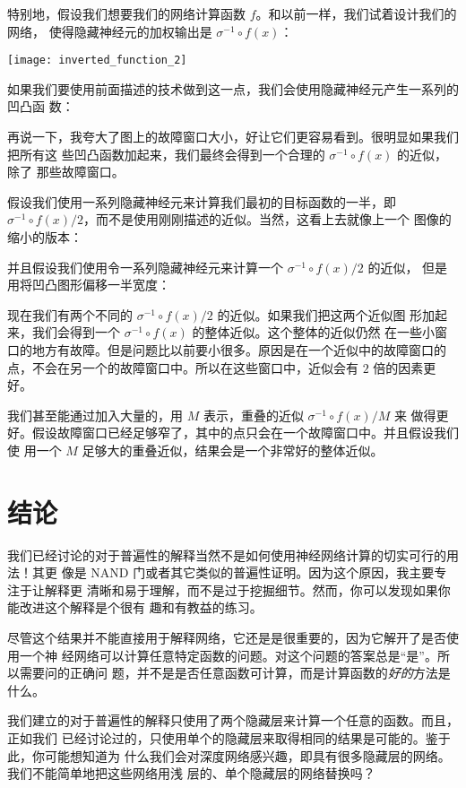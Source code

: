 特别地，假设我们想要我们的网络计算函数 $f$。和以前一样，我们试着设计我们的网络，
使得隐藏神经元的加权输出是 $\sigma^{-1} \circ f(x)$：
\begin{center}
  \texttt{[image: inverted\_function\_2]}
\end{center}

如果我们要使用前面描述的技术做到这一点，我们会使用隐藏神经元产生一系列的凹凸函
数：

再说一下，我夸大了图上的故障窗口大小，好让它们更容易看到。很明显如果我们把所有这
些凹凸函数加起来，我们最终会得到一个合理的 $\sigma^{-1} \circ f(x)$ 的近似，除了
那些故障窗口。

假设我们使用一系列隐藏神经元来计算我们最初的目标函数的一半，即
$\sigma^{-1} \circ f(x) / 2$，而不是使用刚刚描述的近似。当然，这看上去就像上一个
图像的缩小的版本：

并且假设我们使用令一系列隐藏神经元来计算一个 $\sigma^{-1} \circ f(x) / 2$ 的近似，
但是用将凹凸图形偏移一半宽度：

现在我们有两个不同的 $\sigma^{-1} \circ f(x) / 2$ 的近似。如果我们把这两个近似图
形加起来，我们会得到一个 $\sigma^{-1} \circ f(x)$ 的整体近似。这个整体的近似仍然
在一些小窗口的地方有故障。但是问题比以前要小很多。原因是在一个近似中的故障窗口的
点，不会在另一个的故障窗口中。所以在这些窗口中，近似会有 $2$ 倍的因素更好。

我们甚至能通过加入大量的，用 $M$ 表示，重叠的近似 $\sigma^{-1} \circ f(x) / M$ 来
做得更好。假设故障窗口已经足够窄了，其中的点只会在一个故障窗口中。并且假设我们使
用一个 $M$ 足够大的重叠近似，结果会是一个非常好的整体近似。

\section{结论}
\label{sec:conclusion}

我们已经讨论的对于普遍性的解释当然不是如何使用神经网络计算的切实可行的用法！其更
像是 {\serif NAND} 门或者其它类似的普遍性证明。因为这个原因，我主要专注于让解释更
清晰和易于理解，而不是过于挖掘细节。然而，你可以发现如果你能改进这个解释是个很有
趣和有教益的练习。

尽管这个结果并不能直接用于解释网络，它还是是很重要的，因为它解开了是否使用一个神
经网络可以计算任意特定函数的问题。对这个问题的答案总是“是”。所以需要问的正确问
题，并不是是否任意函数可计算，而是计算函数的\emph{好的}方法是什么。

我们建立的对于普遍性的解释只使用了两个隐藏层来计算一个任意的函数。而且，正如我们
已经讨论过的，只使用单个的隐藏层来取得相同的结果是可能的。鉴于此，你可能想知道为
什么我们会对深度网络感兴趣，即具有很多隐藏层的网络。我们不能简单地把这些网络用浅
层的、单个隐藏层的网络替换吗？

